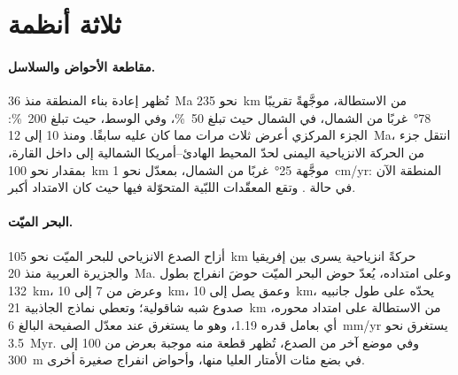 \begin{omfigure}
\par{}\label{fig:b3:extension-strike-slip:strike-slip}
\end{omfigure}

\section{ثلاثة أنظمة}\label{sec:b3:extension-strike-slip:systems}

\paragraph{مقاطعة الأحواض والسلاسل.} تُظهر إعادة بناء المنطقة منذ
\qty{36}{Ma} نحو \qty{235}{km} من الاستطالة، موجَّهةً تقريبًا
\ang{78}~غربًا من الشمال، في الشمال حيث تبلغ \qty{50}{\percent}، وفي
الوسط، حيث تبلغ \qty{200}{\percent}: الجزء المركزي أعرض ثلاث مرات
مما كان عليه سابقًا. ومنذ 10 إلى \qty{12}{Ma}، انتقل جزء من
الحركة الانزياحية اليمنى لحدّ المحيط الهادئ--أمريكا الشمالية إلى داخل القارة،
بمقدار نحو \qty{100}{km} موجَّهة \ang{25}~غربًا من الشمال، بمعدّل نحو \qty{1}{cm/yr}: المنطقة
الآن في حالة . وتقع المعقّدات اللبّية المتحوّلة فيها حيث كان الامتداد أكبر.

\paragraph{البحر الميّت.} أزاح الصدع الانزياحي للبحر الميّت نحو
\qty{105}{km} حركةً انزياحية يسرى بين إفريقيا والجزيرة العربية منذ
\qty{20}{Ma}. وعلى امتداده، يُعدّ حوض البحر الميّت حوضَ انفراج بطول
\qty{132}{km}، وعرض من 7 إلى \qty{10}{km}، وعمق يصل إلى \qty{10}{km}، يحدّه على طول جانبيه
صدوع شبه شاقولية؛ وتعطي نماذج الجاذبية \qty{21}{km} من الاستطالة على امتداد محوره،
أي بعامل قدره 1.19، وهو ما يستغرق عند معدّل الصفيحة البالغ
\qty{6}{mm/yr} يستغرق نحو \qty{3.5}{Myr}. وفي موضع آخر من الصدع، تُظهر قطعة
منه  موجبة بعرض من 100 إلى \qty{300}{m} في
بضع مئات الأمتار العليا منها، وأحواض انفراج صغيرة أخرى.

